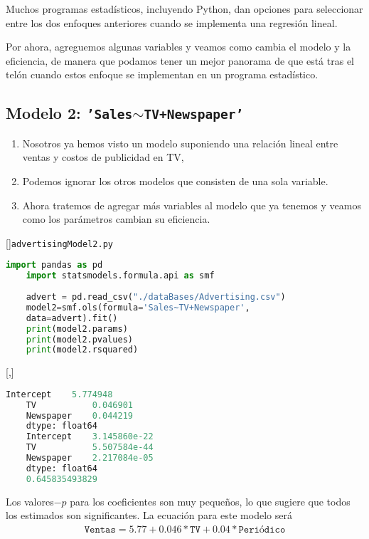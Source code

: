 Muchos programas estadísticos, incluyendo Python, dan opciones para seleccionar entre los dos enfoques anteriores cuando se implementa una regresión lineal.


Por ahora, agreguemos algunas variables y veamos como cambia el modelo y la eficiencia, de manera que podamos tener un mejor panorama de que está tras el telón cuando estos enfoque se implementan en un programa estadístico.

\subsection{Modelo 2: \texttt{'Sales$\sim$TV+Newspaper'}}

\begin{enumerate}
	\item Nosotros ya hemos visto un modelo suponiendo una relación lineal entre ventas y costos de publicidad en TV, 
	\item Podemos ignorar los otros modelos que consisten de una sola variable.
	
	\item Ahora tratemos de agregar más variables al modelo que ya tenemos y veamos como los parámetros cambian su eficiencia.
\end{enumerate}


[]{\texttt{advertisingModel2.py}}
\begin{lstlisting}[language=Python]
	import pandas as pd
	import statsmodels.formula.api as smf
	
	advert = pd.read_csv("./dataBases/Advertising.csv")
	model2=smf.ols(formula='Sales~TV+Newspaper',
	data=advert).fit()
	print(model2.params)
	print(model2.pvalues)
	print(model2.rsquared)
\end{lstlisting}


[,]{}
\begin{lstlisting}[language=Python]
	Intercept    5.774948
	TV           0.046901
	Newspaper    0.044219
	dtype: float64
	Intercept    3.145860e-22
	TV           5.507584e-44
	Newspaper    2.217084e-05
	dtype: float64
	0.645835493829
\end{lstlisting}


Los valores$-p$ para los coeficientes son muy pequeños, lo que sugiere que todos los estimados son significantes.  La ecuación para este modelo será
\begin{align}
	\texttt{Ventas} = 5.77 + 0.046*\texttt{TV} + 0.04*\texttt{Periódico}
\end{align}


